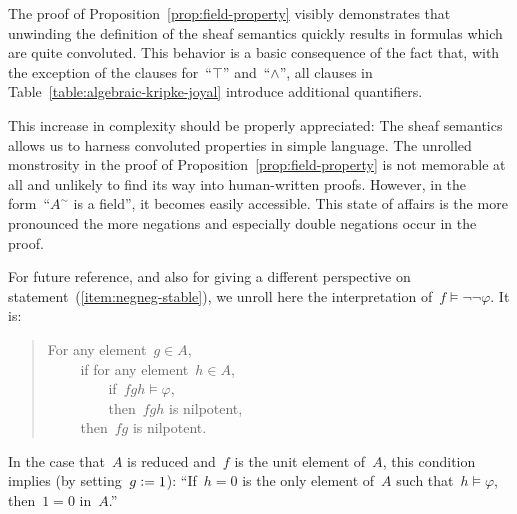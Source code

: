 \documentclass{ws-rv9x6}
\newcommand{\J}{\mathcal{J}}
\newcommand{\defeq}{\vcentcolon=}
\renewcommand{\_}{\mathpunct{.}}
\newcommand{\?}{\,{:}\,}
\begin{document}
The proof of Proposition~\ref{prop:field-property} visibly demonstrates that
unwinding the definition of the sheaf semantics quickly results in formulas
which are quite convoluted. This behavior is a basic consequence of the fact
that, with the exception of the clauses for~``$\top$'' and~``$\wedge$'', all
clauses in Table~\ref{table:algebraic-kripke-joyal} introduce additional
quantifiers.

This increase in complexity should be properly appreciated: The sheaf semantics
allows us to harness convoluted properties in simple language. The unrolled
monstrosity in the proof of Proposition~\ref{prop:field-property} is not
memorable at all and unlikely to find its way into human-written proofs.
However, in the form~``$A^\sim$ is a field'', it becomes easily accessible.
This state of affairs is the more pronounced the more negations and especially
double negations occur in the proof.


\begin{example}\label{ex:negneg-interpretation}
For future reference, and also for giving a different
perspective on statement~(\ref{item:negneg-stable}), we unroll here the
interpretation of~$f \models \neg\neg\varphi$. It is:
\begin{quote}
For any element~$g \in A$, \\
${\qquad}$ if for any element~$h \in A$, \\
${\qquad\qquad}$ if~$fgh \models \varphi$, \\
${\qquad\qquad}$ then~$fgh$ is nilpotent, \\
${\qquad}$ then~$fg$ is nilpotent.
\end{quote}
In the case that~$A$ is reduced and~$f$ is the unit element of~$A$, this
condition implies (by setting~$g \defeq 1$): ``If~$h = 0$ is the only element of~$A$
such that~$h \models \varphi$, then~$1 = 0$ in~$A$.''
\end{example}
\end{document}
